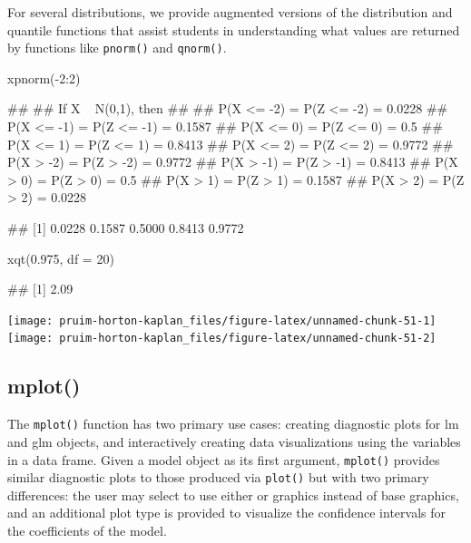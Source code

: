 For several distributions, we provide augmented versions of the
distribution and quantile functions that assist students in
understanding what values are returned by functions like
\texttt{pnorm()} and \texttt{qnorm()}.

\begin{Schunk}
\begin{Sinput}
xpnorm(-2:2)
\end{Sinput}
\begin{Soutput}
## 
## If X ~ N(0,1), then 
## 
##  P(X <= -2) = P(Z <= -2) = 0.0228
##      P(X <= -1) = P(Z <= -1) = 0.1587
##      P(X <= 0) = P(Z <= 0) = 0.5
##      P(X <= 1) = P(Z <= 1) = 0.8413
##      P(X <= 2) = P(Z <= 2) = 0.9772
##  P(X >  -2) = P(Z >  -2) = 0.9772
##      P(X >  -1) = P(Z >  -1) = 0.8413
##      P(X >  0) = P(Z >  0) = 0.5
##      P(X >  1) = P(Z >  1) = 0.1587
##      P(X >  2) = P(Z >  2) = 0.0228
\end{Soutput}
\begin{Soutput}
## [1] 0.0228 0.1587 0.5000 0.8413 0.9772
\end{Soutput}
\begin{Sinput}
xqt(0.975, df = 20)
\end{Sinput}
\begin{Soutput}
## [1] 2.09
\end{Soutput}


\begin{center}\texttt{[image: pruim-horton-kaplan\_files/figure-latex/unnamed-chunk-51-1]} \texttt{[image: pruim-horton-kaplan\_files/figure-latex/unnamed-chunk-51-2]} \end{center}

\end{Schunk}

\subsection{mplot()}\label{mplot}

The \texttt{mplot()} function has two primary use cases: creating
diagnostic plots for lm and glm objects, and interactively creating data
visualizations using the variables in a data frame. Given a model object
as its first argument, \texttt{mplot()} provides similar diagnostic
plots to those produced via \texttt{plot()} but with two primary
differences: the user may select to use either  or
 \citep{ggplot2} graphics instead of base graphics, and
an additional plot type is provided to visualize the confidence
intervals for the coefficients of the model.

